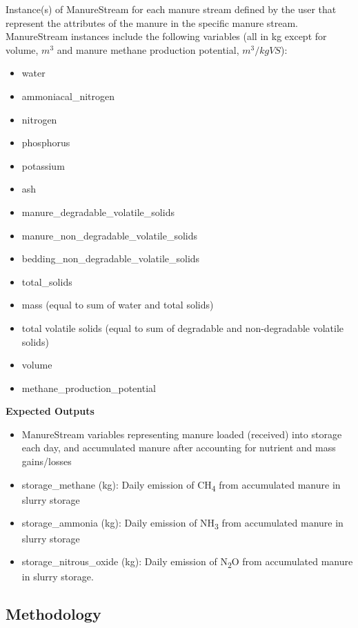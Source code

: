 \begin{refsection}
Instance(s) of ManureStream for each manure stream defined by the user that represent the attributes of the manure in the specific manure stream. ManureStream instances include the following variables (all in kg except for volume, \(m^3\) and manure methane production potential, \(m^3 / kgVS\)):
    \begin{itemize}
        \item water 
        \item ammoniacal\_nitrogen
        \item nitrogen 
        \item phosphorus
        \item potassium
        \item ash
        \item manure\_degradable\_volatile\_solids
        \item manure\_non\_degradable\_volatile\_solids
        \item bedding\_non\_degradable\_volatile\_solids
        \item total\_solids
        \item mass (equal to sum of water and total solids)
        \item total volatile solids (equal to sum of degradable and non-degradable volatile solids)
        \item volume
        \item methane\_production\_potential
\end{itemize}
\vspace{0.5cm}


\textbf{Expected Outputs}
\begin{itemize}
    \item ManureStream variables representing manure loaded (received) into storage each day, and accumulated manure after accounting for nutrient and mass gains/losses
    \item storage\_methane (kg): Daily emission of CH\textsubscript{4} from accumulated manure in slurry storage
    \item storage\_ammonia (kg): Daily emission of NH\textsubscript{3} from accumulated manure in slurry storage
    \item storage\_nitrous\_oxide (kg): Daily emission of N\textsubscript{2}O from accumulated manure in slurry storage.

\end{itemize}
\vspace{0.2cm}


\subsection{Methodology}
\vspace{0.5cm}



\end{refsection}
